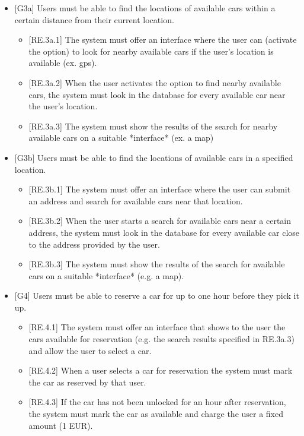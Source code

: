 \documentclass[english]{article}
\begin{document}
\begin{itemize}
\item{[G3a] Users must be able to find the locations of available cars within a certain distance from their current location.
\begin{itemize}
	\item{[RE.3a.1] The system must offer an interface where the user can (activate the option) to look for nearby available cars if the user’s location is available (ex. gps).}
	\item{[RE.3a.2] When the user activates the option to find nearby available cars, the system must look in the database for every available car near the user’s location.}
	\item{[RE.3a.3] The system must show the results of the search for nearby available cars on a suitable *interface* (ex. a map)}
\end{itemize}
}

\item{[G3b] Users must be able to find the locations of available cars in a specified location.
\begin{itemize}
	\item{[RE.3b.1] The system must offer an interface where the user can submit an address and search for available cars near that location.}
	\item{[RE.3b.2] When the user starts a search for available cars near a certain address, the system must look in the database for every available car close to the address provided by the user.}
	\item{[RE.3b.3] The system must show the results of the search for available cars on a suitable *interface* (e.g. a map).}
\end{itemize}
}

\item{[G4] Users must be able to reserve a car for up to one hour before they pick it up.
\begin{itemize}
	\item{[RE.4.1] The system must offer an interface that shows to the user the cars available for reservation (e.g. the search results specified in RE.3a.3) and allow the user to select a car.}
	\item{[RE.4.2] When a user selects a car for reservation the system must mark the car as reserved by that user.}
	\item{[RE.4.3] If the car has not been unlocked for an hour after reservation, the system must mark the car as available and charge the user a fixed amount (1 EUR).}
	

\end{itemize}}
\end{itemize}
\end{document}
